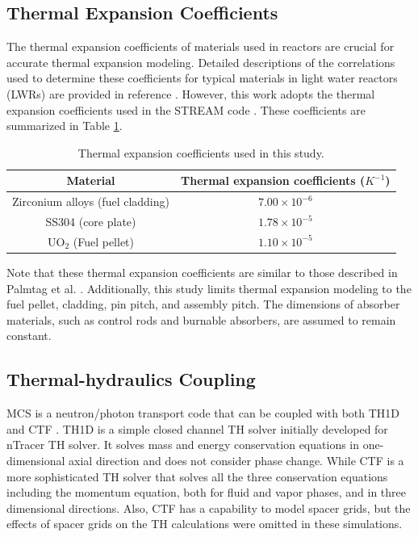 \subsection{Thermal Expansion Coefficients} \label{sec32}

The thermal expansion coefficients of materials used in reactors are crucial for accurate thermal expansion modeling. Detailed descriptions of the correlations used to determine these coefficients for typical materials in light water reactors (LWRs) are provided in reference \cite{palmtag}. However, this work adopts the thermal expansion coefficients used in the STREAM code \cite{choi_2021}. These coefficients are summarized in Table \ref{tab1}.
\begin{table}
    \centering
    \caption{Thermal expansion coefficients used in this study.}
    \label{tab1} 
   \begin{adjustbox}{width=0.72\textwidth} %
    \begin{tabular}{| c | c | }
    \hline 
     Material & Thermal expansion coefficients ($K^{-1}$) \\
     \hline
     Zirconium alloys (fuel cladding)     & $7.00\times10^{-6}$      \\ \hline
     SS304 (core plate)                   & $1.78\times10^{-5}$      \\ \hline
     UO$_2$ (Fuel pellet)                 & $1.10\times10^{-5}$      \\ \hline
    \end{tabular}
    \end{adjustbox}
\end{table}

Note that these thermal expansion coefficients are similar to those described in Palmtag et al. \cite{palmtag}. Additionally, this study limits thermal expansion modeling to the fuel pellet, cladding, pin pitch, and assembly pitch. The dimensions of absorber materials, such as control rods and burnable absorbers, are assumed to remain constant.

\subsection{Thermal-hydraulics Coupling} \label{sec33a}

MCS is a neutron/photon transport code that can be coupled with both TH1D \cite{ryu_2015} and CTF \cite{salko}. TH1D is a simple closed channel TH solver initially developed for nTracer TH solver. It solves mass and energy conservation equations in one-dimensional axial direction and does not consider phase change. While CTF is a more sophisticated TH solver that solves all the three conservation equations including the momentum equation, both for fluid and vapor phases, and in three dimensional directions. Also, CTF has a capability to model spacer grids, but the effects of spacer grids on the TH calculations were omitted in these simulations.

